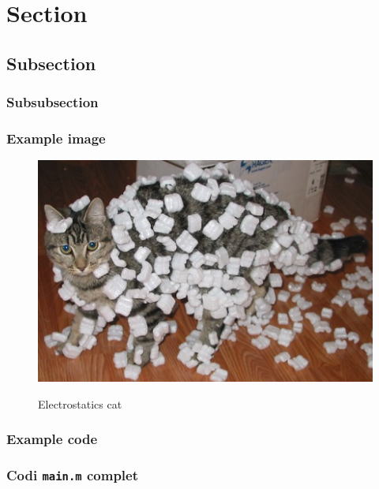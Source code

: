 \section{Section}
\lipsum[1-2]

\subsection{Subsection}
\lipsum[1]

\subsubsection{Subsubsection}
\lipsum[1]

\subsubsection{Example image}
\begin{figure} [h]
    \centering
    \includegraphics[width=0.4\linewidth]{Images/image.png}
    \caption{Electrostatics cat}
    {\label{fig:cat}}
\end{figure}

\subsubsection{Example code}
\subsubsection{Codi \texttt{main.m} complet}

